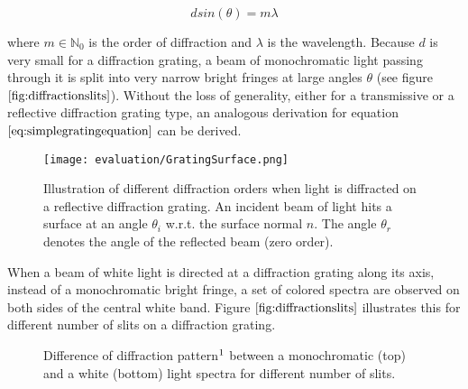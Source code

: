 \begin{equation}
 d sin(\theta) = m \lambda 
\label{eq:simplegratingequation}
\end{equation}

where $m \in \mathds{N}_0$ is the order of diffraction and $\lambda$ is the wavelength. Because $d$ is very small for a diffraction grating, a beam of monochromatic light passing through it is split into very narrow bright fringes at large angles $\theta$ (see figure $\ref{fig:diffractionslits}$). Without the loss of generality, either for a transmissive or a reflective diffraction grating type, an analogous derivation for equation $\ref{eq:simplegratingequation}$ can be derived.

\begin{figure}[H]
  \centering
  \texttt{[image: evaluation/GratingSurface.png]}
  \caption[Different Diffraction Orders]{Illustration of different diffraction orders when light is diffracted on a reflective diffraction grating. An incident beam of light hits a surface at an angle $\theta_i$ w.r.t. the surface normal $n$. The angle $\theta_r$ denotes the angle of the reflected beam (zero order).}
\label{fig:gratingdiffractionorders}
\end{figure}

When a beam of white light is directed at a diffraction grating along its axis, instead of a monochromatic bright fringe, a set of colored spectra are observed on both sides of the central white band. Figure $\ref{fig:diffractionslits}$ illustrates this for different number of slits on a diffraction grating. 

\begin{figure}[H]
  \centering
  
\caption[N Slit Diffraction Grating Pattern]{Difference of diffraction pattern$\footnotemark$ between a monochromatic (top) and a white (bottom) light spectra for different number of slits.}
\label{fig:diffractionslits}
\end{figure}

